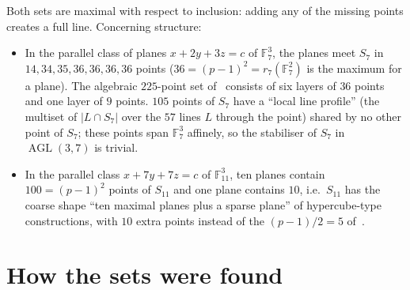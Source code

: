 \documentclass[11pt]{article}
\numberwithin{equation}{section}
\theoremstyle{definition}
\theoremstyle{remark}
\newcommand{\F}{\mathbb F}
\DeclareMathOperator{\AGL}{AGL}
\begin{document}
Both sets are maximal with respect to inclusion: adding any of the missing points creates a full
line. Concerning structure:
\begin{itemize}
\item In the parallel class of planes $x+2y+3z=c$ of $\F_7^3$, the planes meet $S_7$ in
$14,34,35,36,36,36,36$ points ($36=(p-1)^2=r_7(\F_7^2)$ is the maximum for a plane). The
algebraic $225$-point set of~\cite{EFFKPSV} consists of six layers of $36$ points and one layer
of $9$ points. $105$ points of $S_7$ have a ``local line profile'' (the multiset of
$|L\cap S_7|$ over the $57$ lines $L$ through the point) shared by no other point of $S_7$; these
points span $\F_7^3$ affinely, so the stabiliser of $S_7$ in $\AGL(3,7)$ is trivial.
\item In the parallel class $x+7y+7z=c$ of $\F_{11}^3$, ten planes contain $100=(p-1)^2$ points
of $S_{11}$ and one plane contains $10$, i.e.\ $S_{11}$ has the coarse shape ``ten maximal planes
plus a sparse plane'' of hypercube-type constructions, with $10$ extra points instead of the
$(p-1)/2=5$ of~\cite[Thm.~1.7]{EFFKPSV}.
\end{itemize}

\section{How the sets were found}\label{sec:search}
\end{document}
